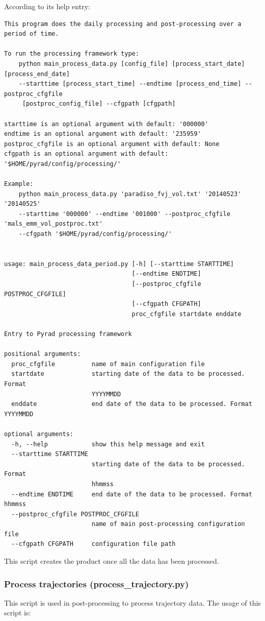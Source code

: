\documentclass[a4paper,11pt,pdftex,twoside]{scrartcl}
\begin{document}
According to its help entry:
\begin{verbatim}
This program does the daily processing and post-processing over a period of time.

To run the processing framework type:
    python main_process_data.py [config_file] [process_start_date] [process_end_date] 
    --starttime [process_start_time] --endtime [process_end_time] --postproc_cfgfile
     [postproc_config_file] --cfgpath [cfgpath]

starttime is an optional argument with default: '000000'
endtime is an optional argument with default: '235959'
postproc_cfgfile is an optional argument with default: None
cfgpath is an optional argument with default: '$HOME/pyrad/config/processing/'

Example:
    python main_process_data.py 'paradiso_fvj_vol.txt' '20140523' '20140525' 
    --starttime '000000' --endtime '001000' --postproc_cfgfile 'mals_emm_vol_postproc.txt' 
    --cfgpath '$HOME/pyrad/config/processing/'


usage: main_process_data_period.py [-h] [--starttime STARTTIME]
                                   [--endtime ENDTIME]
                                   [--postproc_cfgfile POSTPROC_CFGFILE]
                                   [--cfgpath CFGPATH]
                                   proc_cfgfile startdate enddate

Entry to Pyrad processing framework

positional arguments:
  proc_cfgfile          name of main configuration file
  startdate             starting date of the data to be processed. Format
                        YYYYMMDD
  enddate               end date of the data to be processed. Format YYYYMMDD

optional arguments:
  -h, --help            show this help message and exit
  --starttime STARTTIME
                        starting date of the data to be processed. Format
                        hhmmss
  --endtime ENDTIME     end date of the data to be processed. Format hhmmss
  --postproc_cfgfile POSTPROC_CFGFILE
                        name of main post-processing configuration file
  --cfgpath CFGPATH     configuration file path

\end{verbatim}

This script creates the product once all the data has been processed.

\subsubsection{Process trajectories (process\_trajectory.py)}
This script is used in post-processing to process trajectory data. 
The usage of this script is:
\end{document}
